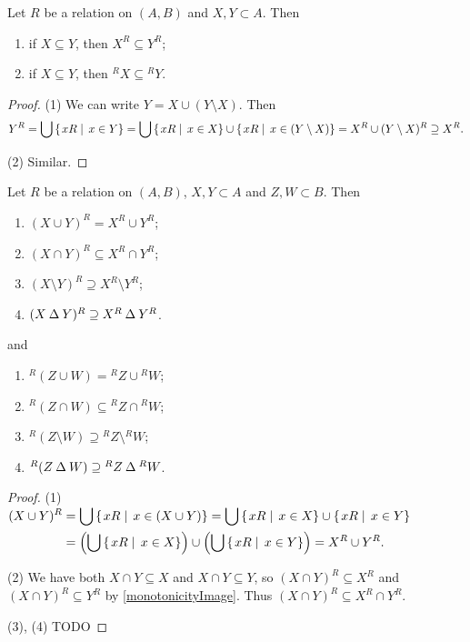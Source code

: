 \begin{corollary} \label{monotonicityImage}
Let $R$ be a relation on $(A, B)$ and $X,Y\subset A$. Then
\begin{enumerate}
\item if $X\subseteq Y$, then $X^R \subseteq Y^R$;
\item if $X\subseteq Y$, then ${^RX} \subseteq {^RY}$.
\end{enumerate}
\end{corollary}
\begin{proof}
(1) We can write $Y = X \cup (Y\setminus X)$. Then
\[ Y^R = \bigcup \left\{\left. xR \;\right|\; x\in Y \right\} = \bigcup \left\{\left. xR \;\right|\; x\in X \right\}\cup\left\{\left. xR \;\right|\; x\in (Y\setminus X) \right\} = X^R \cup (Y\setminus X)^R \supseteq X^R. \]

(2) Similar.
\end{proof}
\begin{corollary} \label{imageRelation} \label{preimageRelation}
Let $R$ be a relation on $(A, B)$, $X,Y\subset A$ and $Z,W\subset B$. Then
\begin{enumerate}
\item $(X\cup Y)^R = X^R\cup Y^R$;
\item $(X\cap Y)^R \subseteq X^R\cap Y^R$;
\item $(X\setminus Y)^R \supseteq X^R\setminus Y^R$;
\item $(X\mathbin{\Delta} Y)^R \supseteq X^R\mathbin{\Delta} Y^R$.
\end{enumerate}
and
\begin{enumerate}
\item $^R(Z\cup W) = {^RZ}\cup {^RW}$;
\item $^R(Z\cap W) \subseteq {^RZ}\cap {^RW}$;
\item $^R(Z\setminus W) \supseteq {^RZ}\setminus {^RW}$;
\item $^R(Z\mathbin{\Delta} W) \supseteq {^RZ}\mathbin{\Delta} {^RW}$.
\end{enumerate}
\end{corollary}
\begin{proof}\mbox{}

(1) $\begin{aligned}[t]
(X\cup Y)^R &= \bigcup \left\{\left. xR \;\right|\; x\in (X\cup Y) \right\} = \bigcup \left\{\left. xR \;\right|\; x\in X \right\}\cup \left\{\left. xR \;\right|\; x\in Y \right\} \\
&= \left(\bigcup \left\{\left. xR \;\right|\; x\in X \right\}\right)\cup \left(\bigcup \left\{\left. xR \;\right|\; x\in Y \right\}\right) = X^R \cup Y^R.
\end{aligned}$

(2) We have both $X\cap Y \subseteq X$ and $X\cap Y \subseteq Y$, so $(X\cap Y)^R \subseteq X^R$ and $(X\cap Y)^R \subseteq Y^R$ by \ref{monotonicityImage}. Thus $(X\cap Y)^R \subseteq X^R\cap Y^R$.

(3), (4) TODO
\end{proof}


